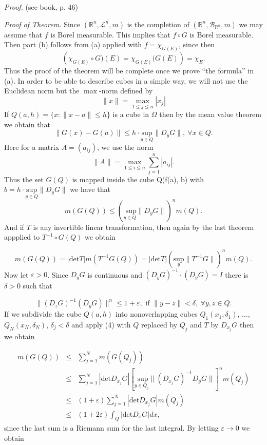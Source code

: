 \documentclass[12pt]{report}
\begin{document}
\vspace{.25cm}
\noindent
{\em Proof.}  (see book, p. 46)

\vspace{.25cm}
\noindent
{\em Proof of Theorem.}  Since $(\mathbb{R}^n,
\mathcal{L}^n, m)$ is the completion of $(\mathbb{R}^n,
\mathcal{B}_{\mathbb{R}^n}, m)$ we may assume that $f$ is
Borel measurable.  This implies that $f \circ G$ is Borel
measurable.  Then part (b) follows from (a) applied with $f =
\chi_{G(E)}$, since then
\[
\left (\chi_{G(E)} \circ G) (E) = \chi_{G(E)} (G(E)\right ) = \chi_E.
\]
Thus the proof of the theorem will be complete once we prove
``the formula'' in (a).  In order to be able to describe cubes in a
simple way, we will not use the Euclidean norm but the
$\max$-norm defined by
\[
\|x\| = \underset{1 \le j \le n}{\max} |x_j|
\]
If $Q(a, h) = \{x: \|x-a\| \le h\}$ is a cube in $\Omega$ then by
the mean value theorem we obtain that
\begin{equation*}
\|G(x) - G(a)\|\le h\cdot\underset{y \in Q}{\mbox{sup}} \|D_yG\|, \
\forall x \in Q.  \tag{2}
\end{equation*}
Here for a matrix $A = (a_{ij})$, we use the norm
\[
\|A\| = \max_{1 \le i \le n} \sum^n_{j=1} |a_{ij}|.
\]
Thus the set $G(Q)$ is mapped inside the cube
Q(f(a), b) with  $b = h\cdot \underset{y \in Q}{\mbox{sup}} \|D_y G\|$
we have that
\begin{equation*}
m(G(Q)) \le \left ( \underset{y \in Q}{\mbox{ sup}} \|D_y
G\|\right )^n m (Q).\tag{3}
\end{equation*}
And if $T$ is any invertible linear transformation, then again by
the last theorem appplied to $T^{-1} \circ G(Q)$ we obtain

\begin{equation*}
m(G(Q)) = |\mbox{det} T|m(T^{-1} G(Q)) = |\mbox{det} T| \left (
\underset{y}{\mbox{sup}} \|T^{-1} G\|\right )^n m (Q).\tag{4}
\end{equation*}
Now let $\varepsilon > 0$.  Since $D_y G$ is continuous and
$(D_y G)^{-1} \cdot (D_y G) = I$ there is $\delta > 0 $ such that

\[
\|(D_z G)^{-1} (D_yG) \|^n \le 1 + \varepsilon, \mbox{ if } \|y - z\|
< \delta, \  \forall y, z \in Q.
\]
If we subdivide the cube $Q(a, h)$ into nonoverlapping cubes
$Q_1(x_1, \delta_1)$, $\dots,$ $Q_N(x_N, \delta_N)$, $\delta_j <
\delta$ and apply (4) with $Q$ replaced by $Q_j$ and $T$ by
$D_{x_j} G$ then we obtain

\begin{eqnarray*}
m(G(Q)) &\le& \sum^N_{j=1} m(G (Q_j))\\
&\le& \sum^N_{j=1} |\mbox{det} D_{x_j} G| \left [\underset{y
\in Q_j}{\mbox{ sup}} \|(D_{x_j} G)^{-1} D_yG\|\right ]^n m(Q_j)\\
&\le& (1 + \varepsilon) \sum^N_{j=1} |\mbox{det} D_{x_j}
G|m(Q_j)\\
&\le& (1 + 2 \varepsilon) \int_Q |\mbox{det} D_x G|dx,
\end{eqnarray*}
since the last sum is a Riemann sum for the last integral.  By
letting $\varepsilon \to 0 $ we obtain
\end{document}
